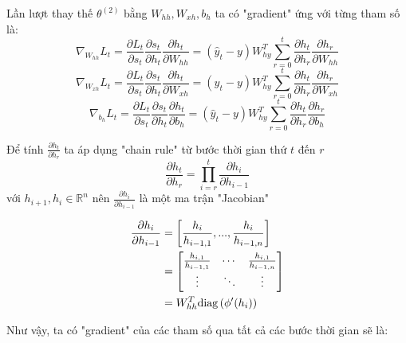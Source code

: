 Lần lượt thay thế $\theta^{(2)}$ bằng $W_{hh}, W_{xh}, b_h$ ta có "gradient" ứng với từng tham số là:
\begin{equation} \label{gradientWRTSt12}
	\nabla_{W_{hh}}L_t = \frac{\partial L_t}{\partial s_t} \frac{\partial s_t}{\partial h_t} \frac{\partial h_t}{\partial W_{hh}}  =  (\hat{y}_t - y) W_{hy}^T \sum_{r=0}^{t} \frac{\partial h_{t}}{\partial h_r} \frac{\partial h_r}{\partial W_{hh}}
\end{equation}
\begin{equation} \label{gradientWRTSt13}
	\nabla_{W_{xh}}L_t = \frac{\partial L_t}{\partial s_t} \frac{\partial s_t}{\partial h_t} \frac{\partial h_t}{\partial W_{xh}}  =  (\hat{y}_t - y) W_{hy}^T \sum_{r=0}^{t} \frac{\partial h_{t}}{\partial h_r} \frac{\partial h_r}{\partial W_{xh}}
\end{equation}
\begin{equation} \label{gradientWRTSt14}
	\nabla_{b_h}L_t = \frac{\partial L_t}{\partial s_t} \frac{\partial s_t}{\partial h_t} \frac{\partial h_t}{\partial b_h}  =  (\hat{y}_t - y) W_{hy}^T \sum_{r=0}^{t} \frac{\partial h_{t}}{\partial h_r} \frac{\partial h_r}{\partial b_h}
\end{equation}

Để tính $\frac{\partial h_t}{\partial h_r}$ ta áp dụng "chain rule" từ bước thời gian thứ $t$ đến $r$
\begin{equation} \label{gradientWRTSt15}
	\frac{\partial h_t}{\partial h_r} = \prod_{i=r}^{t} \frac{\partial h_{i}}{\partial h_{i-1}}
\end{equation}
với $h_{i+1},h_i \in \mathbb{R}^n$ nên $\frac{\partial h_{i}}{\partial h_{i-1}}$ là một ma trận "Jacobian"

\begin{equation} \label{gradientWRTSt16}
\begin{split}
	\frac{\partial h_{i}}{\partial h_{i-1}} &= \left[ \frac{h_{i}}{h_{i-1,1}}, ..., \frac{h_{i}}{h_{i-1,n}} \right] \\
	&= \begin{bmatrix}
  	\frac{h_{i, 1}}{h_{i-1,1}} & \cdots & \frac{h_{i,1}}{h_{i-1,n}}\\
   	\vdots & \ddots & \vdots\\
   	\end{bmatrix} \\
   	&= W_{hh}^T \mathrm{diag} \left( \phi'(h_i) \right)
\end{split} 
\end{equation}

Như vậy, ta có "gradient" của các tham số qua tất cả các bước thời gian sẽ là:

